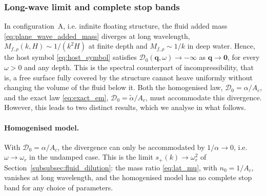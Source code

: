 \subsubsection{Long-wave limit and complete stop bands}\label{subsubsec:lat_long_wave}

In configuration~A, i.e. infinite floating structure, the fluid added mass \eqref{eq:plane_wave_added_mass} diverges at long wavelength, $M_{f,\rho}(k,H)\sim1/(k^2H)$ at finite depth and $M_{f,\rho}\sim1/k$ in deep water. Hence, the host symbol \eqref{eq:host_symbol} satisfies $\mathcal{D}_0(\mathbf{q},\omega)\to-\infty$ as $\mathbf{q}\to\mathbf{0}$, for every $\omega>0$ and any depth. This is the spectral counterpart of incompressibility, that is, a free surface fully covered by the structure cannot heave uniformly without changing the volume of the fluid below it. Both the homogenised law, $\mathcal{D}_0=\alpha/A_c$, and the exact law \eqref{eq:exact_em}, $\mathcal{D}_0=\widetilde{\alpha}/A_c$, must accommodate this divergence. However, this leads to two distinct results, which we analyse in what follows.

\paragraph{Homogenised model.} With $\mathcal{D}_0=\alpha/A_c$, the divergence can only be accommodated by $1/\alpha\to0$, i.e. $\omega\to\omega_r$ in the undamped case. This is the limit $s_+(k)\to\omega_r^2$ of Section~\ref{subsubsec:fluid_dilution}: the mass ratio \eqref{eq:lat_mu}, with $n_0=1/A_c$, vanishes at long wavelength, and the homogenised model has no complete stop band for any choice of parameters.

